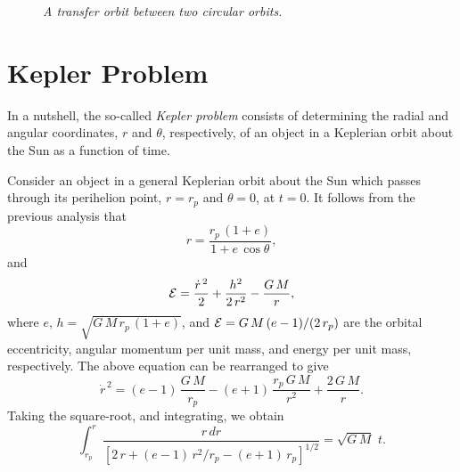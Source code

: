 \begin{figure}
\centerline{}
\caption{\em A transfer orbit between two circular orbits.}\label{fftrans}
\end{figure}

\section{Kepler Problem}
In a nutshell, the so-called {\em Kepler problem}\/ consists of determining
the radial and angular coordinates, $r$ and $\theta$, respectively, of
an object in a Keplerian orbit about the Sun as a function of time.

Consider an object in a general Keplerian orbit about the Sun which
passes through its perihelion point, $r=r_p$ and $\theta=0$, at $t=0$. It
follows from the previous analysis  that
\begin{equation}\label{e6.63x}
r = \frac{r_p\,(1+e)}{1+e\,\cos\theta},
\end{equation}
and
\begin{equation}
{\cal E} = \frac{\dot{r}^{\,2}}{2} + \frac{h^2}{2\,r^2} - \frac{G\,M}{r},
\end{equation}
where $e$, $h = \sqrt{G\,M\,r_p\,(1+e)}$, and ${\cal E} = G\,M\,(e-1)/(2\,r_p)$ are the orbital eccentricity, angular momentum per unit mass, and
energy per unit mass, respectively. The above equation can be rearranged to
give
\begin{equation}
\dot{r}^{\,2} = (e-1)\,\frac{G\,M}{r_p} - (e+1)\,\frac{r_p\,G\,M}{r^2}
+ \frac{2\,G\,M}{r}.
\end{equation}
Taking the square-root, and integrating, we obtain
\begin{equation}\label{e6.66x}
\int_{r_p}^r\frac{r\,dr}{[2\,r + (e-1)\,r^2/r_p - (e+1)\,r_p]^{1/2}} =
\sqrt{G\,M}\,\,t.
\end{equation}

